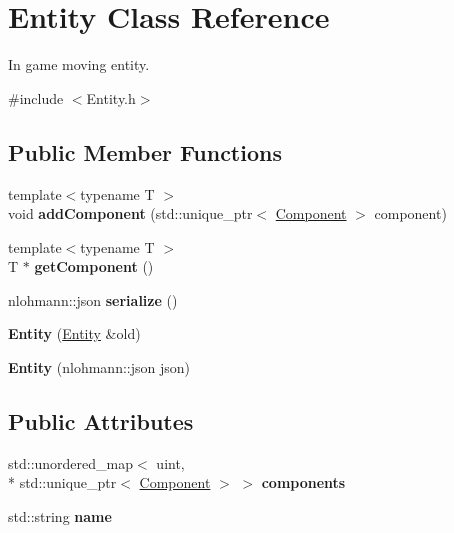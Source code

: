 \hypertarget{classEntity}{\section{Entity Class Reference}
\label{classEntity}
}


In game moving entity.  




{\ttfamily \#include $<$Entity.\-h$>$}

\subsection*{Public Member Functions}
\begin{DoxyCompactItemize}
\item 
\hypertarget{classEntity_afb2d2dd5bbd30e71802726cd45d630ae}{{\footnotesize template$<$typename T $>$ }\\void {\bfseries add\-Component} (std\-::unique\-\_\-ptr$<$ \hyperlink{classComponent}{Component} $>$ component)}\label{classEntity_afb2d2dd5bbd30e71802726cd45d630ae}

\item 
\hypertarget{classEntity_a369c207eab2aed48053346a58b4cdbe2}{{\footnotesize template$<$typename T $>$ }\\T $\ast$ {\bfseries get\-Component} ()}\label{classEntity_a369c207eab2aed48053346a58b4cdbe2}

\item 
\hypertarget{classEntity_a5074110a6e1fc8b3e87cdee9032b5c92}{nlohmann\-::json {\bfseries serialize} ()}\label{classEntity_a5074110a6e1fc8b3e87cdee9032b5c92}

\item 
\hypertarget{classEntity_ad42e3c93df543d22f2bbc8f301fe90d7}{{\bfseries Entity} (\hyperlink{classEntity}{Entity} \&old)}\label{classEntity_ad42e3c93df543d22f2bbc8f301fe90d7}

\item 
\hypertarget{classEntity_a897eef416e1bdc1ab34349caac9da97f}{{\bfseries Entity} (nlohmann\-::json json)}\label{classEntity_a897eef416e1bdc1ab34349caac9da97f}

\end{DoxyCompactItemize}
\subsection*{Public Attributes}
\begin{DoxyCompactItemize}
\item 
\hypertarget{classEntity_ab706f432d78dd17aebad2a6b0fadefac}{std\-::unordered\-\_\-map$<$ uint, \\*
std\-::unique\-\_\-ptr$<$ \hyperlink{classComponent}{Component} $>$ $>$ {\bfseries components}}\label{classEntity_ab706f432d78dd17aebad2a6b0fadefac}

\item 
\hypertarget{classEntity_a931b21fbdebb1a5963b4bcab5df128f5}{std\-::string {\bfseries name}}\label{classEntity_a931b21fbdebb1a5963b4bcab5df128f5}

\end{DoxyCompactItemize}
